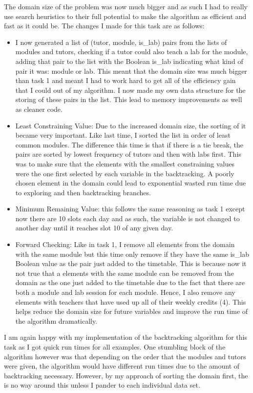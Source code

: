 \documentclass[conference]{IEEEtran}
\begin{document}
The domain size of the problem was now much bigger and as such I had to really use search heuristics to their full potential to make the algorithm as efficient and fast as it could be. The changes I made for this task are as follows:
\begin{itemize}
\item I now generated a list of (tutor, module, is\_lab) pairs from the lists of modules and tutors, checking if a tutor could also teach a lab for the module, adding that pair to the list with the Boolean is\_lab indicating what kind of pair it was: module or lab. This meant that the domain size was much bigger than task 1 and meant I had to work hard to get all of the efficiency gain that I could out of my algorithm. I now made my own data structure for the storing of these pairs in the list. This lead to memory improvements as well as cleaner code.
\item Least Constraining Value: Due to the increased domain size, the sorting of it became very important. Like last time, I sorted the list in order of least common modules. The difference this time is that if there is a tie break, the pairs are sorted by lowest frequency of tutors and then with labs first. This was to make sure that the elements with the smallest constraining values were the one first selected by each variable in the backtracking. A poorly chosen element in the domain could lead to exponential wasted run time due to exploring and then backtracking branches. 
\item Minimum Remaining Value: this follows the same reasoning as task 1 except now there are 10 slots each day and as such, the variable is not changed to another day until it reaches slot 10 of any given day.
\item Forward Checking: Like in task 1, I remove all elements from the domain with the same module but this time only remove if they have the same is\_lab Boolean value as the pair just added to the timetable. This is because now it not true that a elements with the same module can be removed from the domain as the one just added to the timetable due to the fact that there are both a module and lab session for each module. Hence, I also remove any elements with teachers that have used up all of their weekly credits (4). This helps reduce the domain size for future variables and improve the run time of the algorithm dramatically.
\end{itemize}
I am again happy with my implementation of the backtracking algorithm for this task as I got quick run times for all examples. One stumbling block of the algorithm however was that depending on the order that the modules and tutors were given, the algorithm would have different run times due to the amount of backtracking necessary. However, by my approach of sorting the domain first, the is no way around this unless I pander to each individual data set. 
\end{document}
